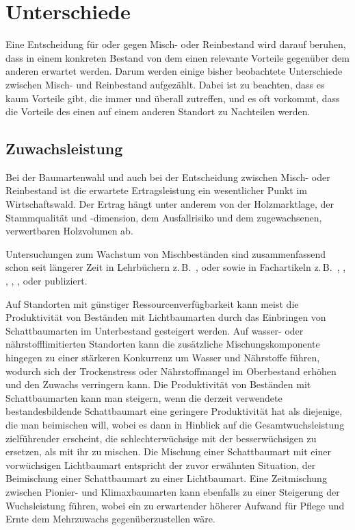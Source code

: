\documentclass[twocolumn, paper=a4, fontsize=10pt, bibliography=totoc, index=totoc]{scrartcl}
\begin{document}
\section{Unterschiede}
\label{sec:unterschiede}

Eine Entscheidung für oder gegen Misch- oder Reinbestand wird darauf beruhen,
dass in einem konkreten Bestand von dem einen relevante Vorteile gegenüber dem
anderen erwartet werden. Darum werden einige bisher beobachtete Unterschiede
zwischen Misch- und Reinbestand aufgezählt. Dabei ist zu beachten, dass es kaum Vorteile
gibt, die immer und überall zutreffen, und es oft vorkommt, dass die Vorteile des
einen auf einem anderen Standort zu Nachteilen werden.

\subsection{Zuwachsleistung}
\label{ssec:zuwachs}

Bei der Baumartenwahl und auch bei der Entscheidung zwischen Misch-
oder Reinbestand ist die erwartete Ertragsleistung ein wesentlicher
Punkt im Wirtschaftswald. Der Ertrag hängt unter anderem von der
Holzmarktlage, der Stammqualität und -dimension, dem Ausfallrisiko
und dem zugewachsenen, verwertbaren Holzvolumen ab.

Untersuchungen zum Wachstum von Mischbeständen sind zusammenfassend schon seit
längerer Zeit in Lehrbüchern z.\,B.\ \citet{wiedemann1951Ertragskunde},
\citet{assmann1961Waldertraskunde} oder \citet{mitscherlich1978WaldWachstumUmwelt}
sowie in Fachartikeln z.\,B.\ \citet{baader1942WasLeistetDerMischbestand},
\citet{kennel1965MischbestandFichteBuche},
\citet{mitscherlich196566ReinUndMischbestand}, \citet{guericke2001mischungBuLae},
\citet{pretzsch2003mischwald}, \citet{bauhus2004mischung} oder
\citet{kelty2006mischwald} publiziert.

Auf Standorten mit günstiger Ressourcenverfügbarkeit kann meist die
Produktivität von Beständen mit Lichtbaumarten durch das Einbringen
von Schattbaumarten im Unterbestand gesteigert werden. Auf wasser-
oder nährstofflimitierten Standorten kann die zusätzliche
Mischungskomponente hingegen zu einer stärkeren Konkurrenz um Wasser
und Nährstoffe führen, wodurch sich der Trockenstress oder
Nährstoffmangel im Oberbestand erhöhen und den Zuwachs verringern
kann. Die Produktivität von Beständen mit Schattbaumarten kann
man steigern, wenn die derzeit verwendete bestandesbildende Schattbaumart eine
geringere Produktivität hat als diejenige, die man beimischen will, wobei es
dann in Hinblick auf die Gesamtwuchsleistung zielführender erscheint, die
schlechterwüchsige mit der besserwüchsigen zu ersetzen, als mit ihr zu mischen.
Die Mischung einer Schattbaumart mit einer vorwüchsigen Lichtbaumart entspricht
der zuvor erwähnten Situation, der Beimischung einer Schattbaumart zu einer
Lichtbaumart. Eine Zeitmischung zwischen Pionier- und Klimaxbaumarten kann
ebenfalls zu einer Steigerung der Wuchsleistung führen, wobei ein zu
erwartender höherer Aufwand für Pflege und Ernte dem Mehrzuwachs
gegenüberzustellen wäre.
\end{document}
